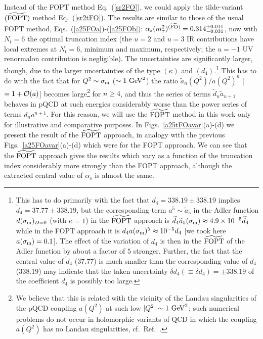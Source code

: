 \documentclass[aps,nofootinbib,showkeys,noshowpacs,preprintnumbers,amsmath,amssymb]{revtex4}
\newcommand{\sm}{{\sigma_{\rm m}}}
\newcommand{\ta}{{\widetilde a}}
\newcommand{\td}{{\widetilde d}}
\begin{document}
Instead of the FOPT method Eq.~(\ref{sr2FO}), we could apply the tilde-variant $({\widetilde{\rm FOPT}})$ method Eq.~(\ref{sr2tFO}). The results are similar to those of the usual FOPT method, Eqs.~(\ref{a25FOa})-(\ref{a25FOb}): $\alpha_s(m_{\tau}^2)^{({\widetilde{\rm FO}})} = 0.314^{+0.011}_{-0.031}$, now with $N_t=6$ the optimal truncation index (the $u=2$ and $u=3$ IR contributions have local extremes at $N_t=6$, minimum and maximum, respectively; the $u=-1$ UV renormalon contribution is negligible). The uncertainties are significantly larger, though, due to the larger uncertainties of the type $(\kappa)$ and $(d_4)$.\footnote{\label{ft:tFO} This has to do primarily with the fact that $d_4 = 338.19 \pm 338.19$ implies ${\td}_4 = 37.77 \pm 338.19$, but the corresponding term $a^5 \sim \ta_5$ in the Adler function $d(\sm)_{D=0}$ (with $\kappa=1$) in the ${\widetilde{\rm FOPT}}$ approach is $\td_4 {\ta}_5(\sm) \approx 4.9 \times 10^{-5} \td_4$ while in the FOPT approach it is $d_4 a(\sm)^5 \approx 10^{-5} d_4$ [we took here $a(\sm) = 0.1$]. The effect of the variation of $d_4$ is then in the ${\widetilde{\rm FOPT}}$ of the Adler function by about a factor of $5$ stronger. Further, the fact that the central value of $\td_4$ ($37.77$) is  much smaller than the corresponding value of $d_4$ ($338.19$) may indicate that the taken uncertainty $\delta {\td}_4 (\equiv \delta d_4) = \pm 338.19$ of the coefficient $d_4$ is possibly too large.} This has to do with the fact that for $Q^2 \sim \sm$ ($\sim 1 \ {\rm GeV}^2$) the ratio $\ta_n(Q^2)/a(Q^2)^n$ [$=1 + {\cal O}(a)$] becomes large\footnote{We believe that this is related with the vicinity of the Landau singularities of the pQCD coupling $a(Q^2)$ at such low $|Q^2| \sim 1 \ {\rm GeV}^2$; such numerical problems do not occur in holomorphic variants of QCD in which the coupling $a(Q^2)$ has no Landau singularities, cf.~Ref.~\cite{renmod}.}  for $n \geq 4$, and thus the series of terms $\td_{n} \ta_{n+1}$ behaves in pQCD at such energies considerably worse than the power series of terms $d_n a^{n+1}$. For this reason, we will use the ${\widetilde{\rm FOPT}}$ method in this work only for illustrative and comparative purposes. In Figs.~\ref{a25tFOavar}(a)-(d) we present the result of the ${\widetilde{\rm FOPT}}$ approach, in analogy with the previous Figs.~\ref{a25FOavar}(a)-(d) which were for the FOPT approach. We can see that the  ${\widetilde{\rm FOPT}}$ approach gives the results which vary as a function of the truncation index considerably more strongly than the FOPT approach, although the extracted central value of $\alpha_s$ is almost the same.
\end{document}
